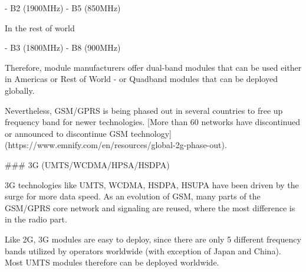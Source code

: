 \documentclass[11pt, oneside]{article}   	%
\newcommand{\addspace}{\vspace{2mm}}
\begin{document}
\addspace
{}
\addspace
\begin{markdown}
- B2 (1900MHz)
- B5 (850MHz)
\end{markdown}
\addspace
\begin{markdown}
In the rest of world
\end{markdown}
\addspace
\begin{markdown}
- B3 (1800MHz)
- B8 (900MHz)
\end{markdown}
\addspace
\begin{markdown}
Therefore, module manufacturers offer dual-band modules that can be used either in Americas or Rest of World - or Quadband modules that can be deployed globally.

Nevertheless, GSM/GPRS is being phased out in several countries to free up frequency band for newer technologies.
[More than 60 networks have discontinued or announced to discontinue GSM technology](https://www.emnify.com/en/resources/global-2g-phase-out).

### 3G (UMTS/WCDMA/HPSA/HSDPA)

3G technologies like UMTS, WCDMA, HSDPA, HSUPA have been driven by the surge for more data speed.
As an evolution of GSM, many parts of the GSM/GPRS core network and signaling are reused, where the most difference is in the radio part.

Like 2G, 3G modules are easy to deploy, since there are only 5 different frequency bands utilized by operators worldwide (with exception of Japan and China).
Most UMTS modules therefore can be deployed worldwide.
\end{markdown}
\addspace
\end{document}
